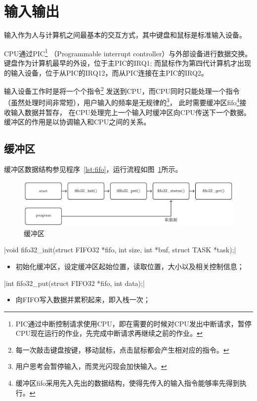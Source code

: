 \section{输入输出}
输入作为人与计算机之间最基本的交互方式，其中键盘和鼠标是标准输入设备。

CPU通过PIC\footnote{PIC通过中断控制请求使用CPU，即在需要的时候对CPU发出中断请求，暂停CPU现在运行的作业，先完成中断请求再继续之前的作业。}
（Programmable interrupt controller）与外部设备进行数据交换。
键盘作为计算机最早的外设，位于主PIC的IRQ1;
而鼠标作为第四代计算机才出现的输入设备，位于从PIC的IRQ12，而从PIC连接在主PIC的IRQ2。

输入设备工作时是将一个个指令\footnote{每一次敲击键盘按键，移动鼠标，点击鼠标都会产生相对应的指令。}
发送到CPU，而CPU同时只能处理一个指令（虽然处理时间非常短），用户输入的频率是无规律的\footnote{用户思考会暂停输入，而灵光闪现会加快输入。}，
此时需要缓冲区fifo\footnote{缓冲区fifo采用先入先出的数据结构，使得先传入的输入指令能够率先得到执行。}接收输入数据并暂存，
在CPU处理完上一个输入时缓冲区向CPU传送下一个数据。缓冲区的作用是以协调输入和CPU之间的关系。

\subsection{缓冲区}

缓冲区数据结构参见程序~\ref{lst:fifo}，运行流程如图~\ref{fig:fifo}所示。

\begin{figure}[H]
    \centering
    \includegraphics[width=\textwidth]{../Fig/func/fifo.pdf}
    \caption{缓冲区}
    \label{fig:fifo}
\end{figure}

\csingle|void fifo32_init(struct FIFO32 *fifo, int size, int *buf, struct TASK *task);|
\begin{itemize}
  \item 初始化缓冲区，设定缓冲区起始位置，读取位置，大小以及相关控制信息；
\end{itemize}

\csingle|int fifo32_put(struct FIFO32 *fifo, int data);|
\begin{itemize}
  \item 向FIFO写入数据并累积起来，即入栈一次；
\end{itemize}

